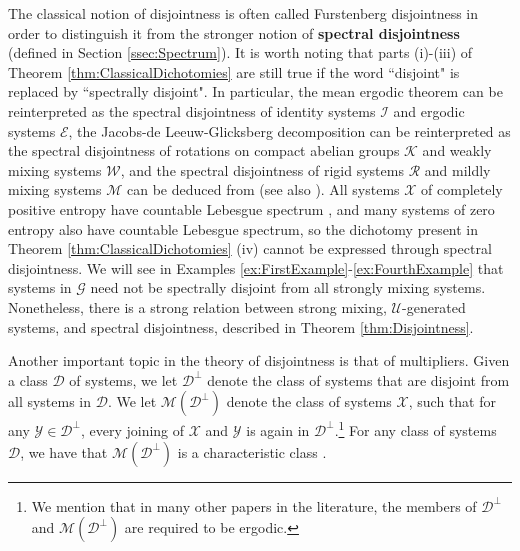 \documentclass[graybox]{svmult}
\theoremstyle{definition}
\newcommand{\edit}[3]{\color{#1}{#3}\color{black}\marginpar{\textcolor{#1}{[[#2]]}}}
\newcommand{\jpm}[1]{\edit{ggreen}{JPM}{[[#1]]}}
\renewcommand{\sf}[1]{\edit{yyellow}{SF}{[[#1]]}}
\begin{document}
The classical notion of disjointness is often called Furstenberg disjointness in order to distinguish it from the stronger notion of \textbf{spectral disjointness} (defined in Section \ref{ssec:Spectrum}).
It is worth noting that parts (i)-(iii) of Theorem \ref{thm:ClassicalDichotomies} are still true if the word ``disjoint" is replaced by ``spectrally disjoint".
In particular, the mean ergodic theorem can be reinterpreted as the spectral disjointness of identity systems $\mathcal{I}$ and ergodic systems $\mathcal{E}$, the Jacobs-de Leeuw-Glicksberg decomposition can be reinterpreted as the spectral disjointness of rotations on compact abelian groups $\mathcal{K}$ and weakly mixing systems $\mathcal{W}$, 
and the spectral disjointness of rigid systems $\mathcal{R}$ and mildly mixing systems $\mathcal{M}$ can be deduced from 
\cite[Lemma 1]{Walters1972} (see also \cite[Theorem 0.4]{PolynomialActionsOfUnitaryOperators}).
All systems $\mathcal{X}$ of completely positive entropy have countable Lebesgue spectrum \cite{KMixingImpliesLebesgueSpectrumAmenable}, and many systems of zero entropy also have countable Lebesgue spectrum, so the dichotomy present in Theorem \ref{thm:ClassicalDichotomies} (iv) cannot be expressed through spectral disjointness.
We will see in Examples \ref{ex:FirstExample}-\ref{ex:FourthExample} that systems in $\mathcal{G}$ need not be spectrally disjoint from all strongly mixing systems. 
Nonetheless, there is a strong relation between strong mixing, $\mathcal U$-generated systems, and spectral disjointness, described in Theorem \ref{thm:Disjointness}. 



Another important topic in the theory of disjointness is that of multipliers. 
Given a class $\mathscr{D}$ of systems, we let $\mathscr{D}^\perp$ denote the class of systems that are disjoint from all systems in $\mathscr{D}$.
We let $\mathscr{M}(\mathscr{D}^\perp)$ denote the class of systems $\mathcal{X}$, such that for any $\mathcal{Y} \in \mathscr{D}^\perp$, every joining of $\mathcal{X}$ and $\mathcal{Y}$ is again in $\mathscr{D}^\perp$.\footnote{We mention that in many other papers in the literature, the members of $\mathscr{D}^\perp$ and $\mathscr{M}(\mathscr{D}^\perp)$ are required to be ergodic.}
For any class of systems $\mathscr{D}$, we have that $\mathscr{M}(\mathscr{D}^\perp)$ is a characteristic class \cite[Section 2.1]{ArithmeticFunctionsOrthogonalToDeterminism}.
\end{document}
